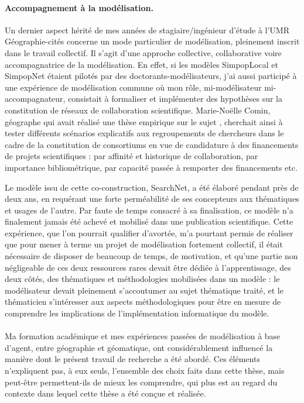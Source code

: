 \paragraph{Accompagnement à la modélisation.}

Un dernier aspect hérité de mes années de stagiaire/ingénieur d'étude à l'UMR Géographie-cités concerne un mode particulier de modélisation, pleinement inscrit dans le travail collectif.
Il s'agit d'une approche collective, collaborative voire accompagnatrice de la modélisation.
En effet, si les modèles SimpopLocal et SimpopNet étaient pilotés par des doctorants-modélisateurs, j'ai aussi participé à une expérience de modélisation commune où mon rôle, mi-modélisateur mi-accompagnateur, consistait à formaliser et implémenter des hypothèses sur la constitution de réseaux de collaboration scientifique.
Marie-Noëlle Comin, géographe qui avait réalisé une thèse empirique sur le sujet \autocite{comin_reseaux_2009}, cherchait ainsi à tester différents scénarios explicatifs aux regroupements de chercheurs dans le cadre de la constitution de consortiums en vue de candidature à des financements de projets scientifiques :
par affinité et historique de collaboration, par importance bibliométrique, par capacité passée à remporter des financements etc.

Le modèle issu de cette co-construction, SearchNet, a été élaboré pendant près de deux ans, en requérant une forte perméabilité de ses concepteurs aux thématiques et usages de l'autre.
Par faute de temps consacré à sa finalisation, ce modèle n'a finalement jamais été achevé et mobilisé dans une publication scientifique.
Cette expérience, que l'on pourrait qualifier d'avortée, m'a pourtant permis de réaliser que pour mener à terme un projet de modélisation fortement collectif, il était nécessaire de disposer de beaucoup de temps, de motivation, et qu'une partie non négligeable de ces deux ressources rares devait être dédiée à l'apprentissage, des deux côtés, des thématiques et méthodologies mobilisées dans un modèle : le modélisateur devait pleinement s'accoutumer au sujet thématique traité, et le thématicien s'intéresser aux aspects méthodologiques pour être en mesure de comprendre les implications de l'implémentation informatique du modèle.

\bigskip
\paragraph[Conclusion intermédiaire]{}

Ma formation académique et mes expériences passées de modélisation à base d'agent, entre géographie et géomatique, ont considérablement influencé la manière dont le présent travail de recherche a été abordé.
Ces éléments n'expliquent pas, à eux seuls, l'ensemble des choix faits dans cette thèse, mais peut-être permettent-ils de mieux les comprendre, qui plus est au regard du contexte dans lequel cette thèse a été conçue et réalisée.

